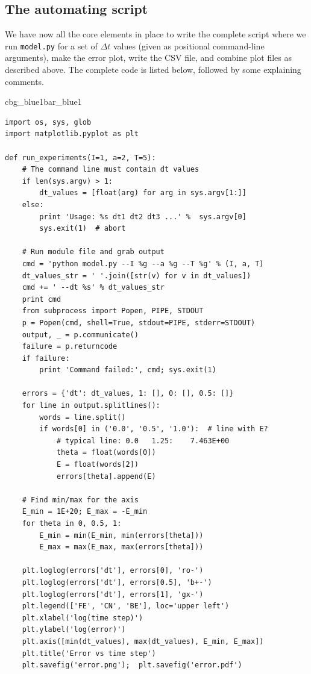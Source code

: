 \documentclass[%
oneside,                 %
final,                   %
10pt]{article}
\newenvironment{_pro_tight}[2]{
   \def\FrameCommand{\color{#2}\vrule width 1mm\normalcolor\colorbox{#1}}
   \FrameRule0.6pt\MakeFramed {\advance\hsize-2mm\FrameRestore}\vskip3mm}
   {\vskip0mm\endMakeFramed}
\newenvironment{pro}[2]{
\bgroup\rmfamily
\fboxsep=0mm\relax
\begin{_pro_tight}{#1}{#2}
\list{}{\parsep=-2mm\parskip=0mm\topsep=0pt\leftmargin=2mm
\rightmargin=2\leftmargin\leftmargin=4pt\relax}
\item\relax}
{\endlist\end{_pro_tight}\egroup}
\begin{document}
\subsection{The automating script}

We have now all the core elements in place to write the complete
script where we run
\texttt{model.py} for a set of $\Delta t$ values (given as positional
command-line arguments), make the error plot,
write the CSV file, and combine plot files as described above.
The complete code is listed below, followed by some explaining comments.

\begin{pro}{cbg_blue1}{bar_blue1}\begin{Verbatim}[numbers=none,fontsize=\fontsize{9pt}{9pt},baselinestretch=0.95,xleftmargin=2mm]
import os, sys, glob
import matplotlib.pyplot as plt

def run_experiments(I=1, a=2, T=5):
    # The command line must contain dt values
    if len(sys.argv) > 1:
        dt_values = [float(arg) for arg in sys.argv[1:]]
    else:
        print 'Usage: %s dt1 dt2 dt3 ...' %  sys.argv[0]
        sys.exit(1)  # abort

    # Run module file and grab output
    cmd = 'python model.py --I %g --a %g --T %g' % (I, a, T)
    dt_values_str = ' '.join([str(v) for v in dt_values])
    cmd += ' --dt %s' % dt_values_str
    print cmd
    from subprocess import Popen, PIPE, STDOUT
    p = Popen(cmd, shell=True, stdout=PIPE, stderr=STDOUT)
    output, _ = p.communicate()
    failure = p.returncode
    if failure:
        print 'Command failed:', cmd; sys.exit(1)

    errors = {'dt': dt_values, 1: [], 0: [], 0.5: []}
    for line in output.splitlines():
        words = line.split()
        if words[0] in ('0.0', '0.5', '1.0'):  # line with E?
            # typical line: 0.0   1.25:    7.463E+00
            theta = float(words[0])
            E = float(words[2])
            errors[theta].append(E)

    # Find min/max for the axis
    E_min = 1E+20; E_max = -E_min
    for theta in 0, 0.5, 1:
        E_min = min(E_min, min(errors[theta]))
        E_max = max(E_max, max(errors[theta]))

    plt.loglog(errors['dt'], errors[0], 'ro-')
    plt.loglog(errors['dt'], errors[0.5], 'b+-')
    plt.loglog(errors['dt'], errors[1], 'gx-')
    plt.legend(['FE', 'CN', 'BE'], loc='upper left')
    plt.xlabel('log(time step)')
    plt.ylabel('log(error)')
    plt.axis([min(dt_values), max(dt_values), E_min, E_max])
    plt.title('Error vs time step')
    plt.savefig('error.png');  plt.savefig('error.pdf')


\end{Verbatim}
\end{pro}
\end{document}
